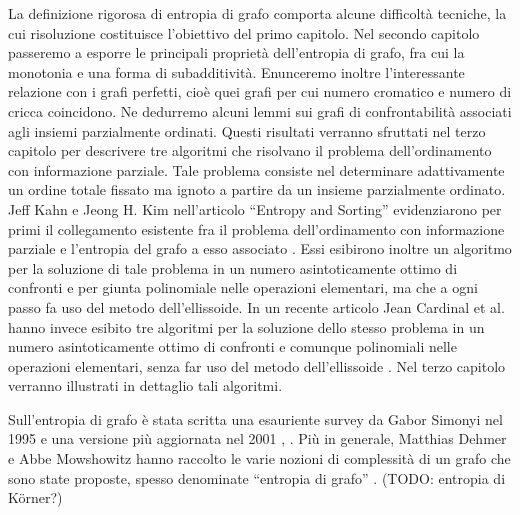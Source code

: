 La definizione rigorosa di entropia di grafo comporta alcune difficoltà tecniche, la cui risoluzione costituisce l'obiettivo del primo capitolo. Nel secondo capitolo passeremo a esporre le principali proprietà dell'entropia di grafo, fra cui la monotonia e una forma di subadditività. Enunceremo inoltre l'interessante relazione con i grafi perfetti, cioè quei grafi per cui numero cromatico e numero di cricca coincidono. Ne dedurremo alcuni lemmi sui grafi di confrontabilità associati agli insiemi parzialmente ordinati. Questi risultati verranno sfruttati nel terzo capitolo per descrivere tre algoritmi che risolvano il problema dell'ordinamento con informazione parziale. Tale problema consiste nel determinare adattivamente un ordine totale fissato ma ignoto a partire da un insieme parzialmente ordinato. Jeff Kahn e Jeong H. Kim nell'articolo ``Entropy and Sorting'' evidenziarono per primi il collegamento esistente fra il problema dell'ordinamento con informazione parziale e l'entropia del grafo a esso associato \cite{Kahn1995}. Essi esibirono inoltre un algoritmo per la soluzione di tale problema in un numero asintoticamente ottimo di confronti e per giunta polinomiale nelle operazioni elementari, ma che a ogni passo fa uso del metodo dell'ellissoide. In un recente articolo Jean Cardinal et al. hanno invece esibito tre algoritmi per la soluzione dello stesso problema in un numero asintoticamente ottimo di confronti e comunque polinomiali nelle operazioni elementari, senza far uso del metodo dell'ellissoide \cite{Cardinal2010}. Nel terzo capitolo verranno illustrati in dettaglio tali algoritmi.

Sull'entropia di grafo è stata scritta una esauriente survey da Gabor Simonyi nel 1995 e una versione più aggiornata nel 2001 \cite{Simonyi1995}, \cite{Simonyi2001}. Più in generale, Matthias Dehmer e Abbe Mowshowitz hanno raccolto le varie nozioni di complessità di un grafo che sono state proposte, spesso denominate ``entropia di grafo'' \cite{Dehmer2011}. (TODO: entropia di K\"orner?)


